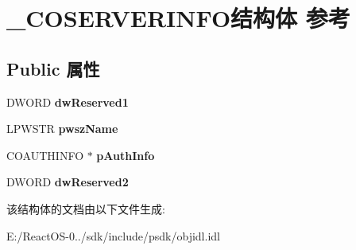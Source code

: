\hypertarget{struct___c_o_s_e_r_v_e_r_i_n_f_o}{}\section{\+\_\+\+C\+O\+S\+E\+R\+V\+E\+R\+I\+N\+F\+O结构体 参考}
\label{struct___c_o_s_e_r_v_e_r_i_n_f_o}
\subsection*{Public 属性}
\begin{DoxyCompactItemize}
\item 
\mbox{\label{struct___c_o_s_e_r_v_e_r_i_n_f_o_a168ac08b944cf7d957fcb574debb82f6}} 
D\+W\+O\+RD {\bfseries dw\+Reserved1}
\item 
\mbox{\label{struct___c_o_s_e_r_v_e_r_i_n_f_o_ac36e4c8ce0008110f05be229773c6661}} 
L\+P\+W\+S\+TR {\bfseries pwsz\+Name}
\item 
\mbox{\label{struct___c_o_s_e_r_v_e_r_i_n_f_o_a7c30c07a7d99d4af5f959277f4cda9bf}} 
C\+O\+A\+U\+T\+H\+I\+N\+FO $\ast$ {\bfseries p\+Auth\+Info}
\item 
\mbox{\label{struct___c_o_s_e_r_v_e_r_i_n_f_o_aac2451e79eb405b4dbd3d3fd2a7fdea2}} 
D\+W\+O\+RD {\bfseries dw\+Reserved2}
\end{DoxyCompactItemize}


该结构体的文档由以下文件生成\+:\begin{DoxyCompactItemize}
\item 
E\+:/\+React\+O\+S-\/0../sdk/include/psdk/objidl.\+idl\end{DoxyCompactItemize}
